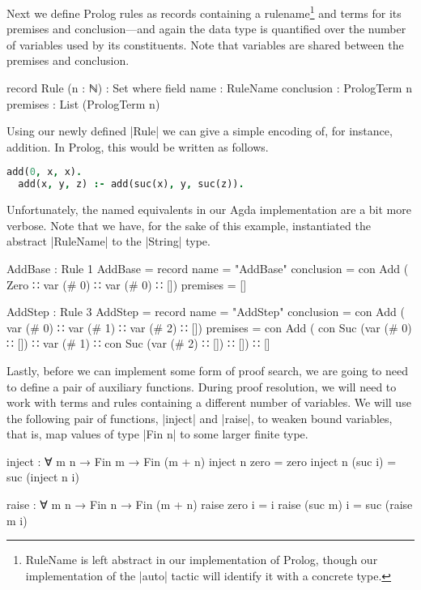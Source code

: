 \documentclass[preprint]{sigplanconf}
\begin{document}
Next we define Prolog rules as records containing a rulename\footnote{
  RuleName is left abstract in our implementation of Prolog, though
  our implementation of the |auto| tactic will identify it with a
  concrete type.
} and terms for its
premises and conclusion---and again the data type is quantified over
the number of variables used by its constituents. Note that variables
are shared between the premises and conclusion.
\begin{code}
  record Rule (n : ℕ) : Set where
    field
      name        : RuleName
      conclusion  : PrologTerm n
      premises    : List (PrologTerm n)
\end{code}
Using our newly defined |Rule| we can give a simple encoding of, for
instance, addition. In Prolog, this would be written as follows.
\begin{lstlisting}[language=Prolog]
  add(0, x, x).
  add(x, y, z) :- add(suc(x), y, suc(z)).
\end{lstlisting}
Unfortunately, the named equivalents in our Agda implementation are a
bit more verbose. Note that we have, for the sake of this example,
instantiated the abstract |RuleName| to the |String| type.
\begin{code}
AddBase : Rule 1
AddBase = record {
  name        = "AddBase"
  conclusion  = con Add  (  Zero
                         ∷  var (# 0)
                         ∷  var (# 0)
                         ∷ [])
  premises    = []
  }
\end{code}%
\begin{code}
AddStep : Rule 3
AddStep = record {
  name        = "AddStep"
  conclusion  =  con Add  (  var (# 0)
                          ∷  var (# 1)
                          ∷  var (# 2)
                          ∷ [])
  premises    =  con Add  (  con Suc (var (# 0) ∷ [])
                          ∷  var (# 1)
                          ∷  con Suc (var (# 2) ∷ [])
                          ∷ [])
                 ∷ []
  }
\end{code}
Lastly, before we can implement some form of proof search, we are
going to need to define a pair of auxiliary functions. During proof
resolution, we will need to work with terms and rules containing a
different number of variables. We will use the following pair of
functions, |inject| and |raise|, to weaken bound variables, that is,
map values of type |Fin n| to some larger finite type.
\begin{code}
  inject : ∀ {m} n → Fin m → Fin (m + n)
  inject n  zero    = zero
  inject n (suc i)  = suc (inject n i)

  raise : ∀ m {n} → Fin n → Fin (m + n)
  raise  zero    i  = i
  raise (suc m)  i  = suc (raise m i)
\end{code}
\end{document}
